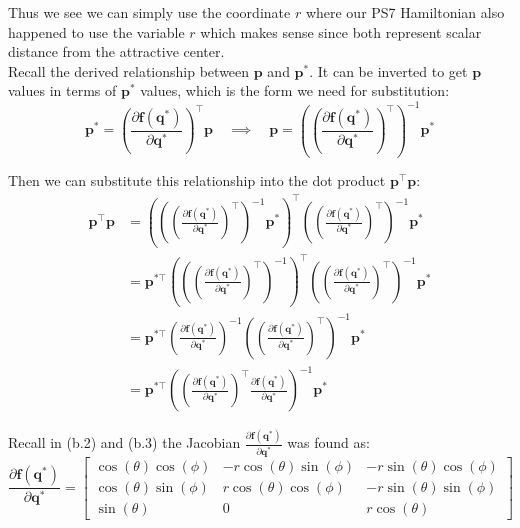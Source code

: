 \documentclass[titlepage]{article}
\begin{document}
Thus we see we can simply use the coordinate $r$ where our PS7 Hamiltonian also happened to use the variable $r$ which makes sense since both represent scalar distance from the attractive center.\\

Recall the derived relationship between $\boldsymbol{p}$ and $\boldsymbol{p}^*$. It can be inverted to get $\boldsymbol{p}$ values in terms of $\boldsymbol{p}^*$ values, which is the form we need for substitution:
\begin{equation}
	\boldsymbol{p}^*=\left(\frac{\partial\boldsymbol{f}(\boldsymbol{q}^*)}{\partial\boldsymbol{q}^*}\right)^\top\boldsymbol{p}\quad\implies\quad\boldsymbol{p}=\left(\left(\frac{\partial\boldsymbol{f}(\boldsymbol{q}^*)}{\partial\boldsymbol{q}^*}\right)^\top\right)^{-1}\boldsymbol{p}^*
\end{equation}

Then we can substitute this relationship into the dot product $\boldsymbol{p}^\top\boldsymbol{p}$:
\begin{equation}
	\begin{split}
		\boldsymbol{p}^\top\boldsymbol{p}&=\left(\left(\left(\frac{\partial\boldsymbol{f}(\boldsymbol{q}^*)}{\partial\boldsymbol{q}^*}\right)^\top\right)^{-1}\boldsymbol{p}^*\right)^\top\left(\left(\frac{\partial\boldsymbol{f}(\boldsymbol{q}^*)}{\partial\boldsymbol{q}^*}\right)^\top\right)^{-1}\boldsymbol{p}^* \\
		&=\boldsymbol{p}^{*\top}\left(\left(\left(\frac{\partial\boldsymbol{f}(\boldsymbol{q}^*)}{\partial\boldsymbol{q}^*}\right)^\top\right)^{-1}\right)^\top\left(\left(\frac{\partial\boldsymbol{f}(\boldsymbol{q}^*)}{\partial\boldsymbol{q}^*}\right)^\top\right)^{-1}\boldsymbol{p}^* \\
		&=\boldsymbol{p}^{*\top}\left(\frac{\partial\boldsymbol{f}(\boldsymbol{q}^*)}{\partial\boldsymbol{q}^*}\right)^{-1}\left(\left(\frac{\partial\boldsymbol{f}(\boldsymbol{q}^*)}{\partial\boldsymbol{q}^*}\right)^\top\right)^{-1}\boldsymbol{p}^* \\
		&=\boldsymbol{p}^{*\top}\left(\left(\frac{\partial\boldsymbol{f}(\boldsymbol{q}^*)}{\partial\boldsymbol{q}^*}\right)^\top\frac{\partial\boldsymbol{f}(\boldsymbol{q}^*)}{\partial\boldsymbol{q}^*}\right)^{-1}\boldsymbol{p}^*
	\end{split}
\end{equation}

Recall in (b.2) and (b.3) the Jacobian $\frac{\partial\boldsymbol{f}(\boldsymbol{q}^*)}{\partial\boldsymbol{q}^*}$ was found as:
\begin{equation}
	\frac{\partial\boldsymbol{f}(\boldsymbol{q}^*)}{\partial\boldsymbol{q}^*}=
	\begin{bmatrix}
		\cos(\theta)\cos(\phi) & -r\cos(\theta)\sin(\phi) & -r\sin(\theta)\cos(\phi) \\
		\cos(\theta)\sin(\phi) & r\cos(\theta)\cos(\phi) & -r\sin(\theta)\sin(\phi) \\
		\sin(\theta) & 0 & r\cos(\theta)
	\end{bmatrix}
\end{equation}
\end{document}
